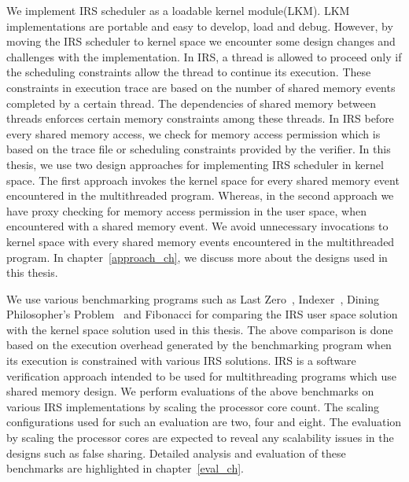 We implement IRS scheduler as a loadable kernel module(LKM). 
LKM implementations are portable and easy to develop, load and debug. 
However, by moving the IRS scheduler to kernel space we encounter some design changes and challenges with the implementation. 
In IRS, a thread is allowed to proceed only if the scheduling constraints allow the thread to continue its execution. 
These constraints in execution trace are based on the number of shared memory events completed by a certain thread. 
The dependencies of shared memory between threads enforces certain memory constraints among these threads. 
In IRS before every shared memory access, we check for memory access permission which is based on the trace file or scheduling constraints provided by the verifier. 
In this thesis, we use two design approaches for implementing IRS scheduler in kernel space. 
The first approach invokes the kernel space for every shared memory event encountered in the multithreaded program. 
Whereas, in the second approach we have proxy checking for memory access permission in the user space, when encountered with a shared memory event. 
We avoid unnecessary invocations to kernel space with every shared memory events encountered in the multithreaded program. 
In chapter~\ref{approach_ch}, we discuss more about the designs used in this thesis. 

We use various benchmarking programs such as Last Zero~\citep{abdulla2014optimal}, Indexer~\citep{dynamic_por}, Dining Philosopher's Problem~\citep{silberschatz2014operating} and Fibonacci for comparing the IRS user space solution with the kernel space solution used in this thesis. 
The above comparison is done based on the execution overhead generated by the benchmarking program when its execution is constrained with various IRS solutions. 
IRS is a software verification approach intended to be used for multithreading programs which use shared memory design. 
We perform evaluations of the above benchmarks on various IRS implementations by scaling the processor core count. 
The scaling configurations used for such an evaluation are two, four and eight. 
The evaluation by scaling the processor cores are expected to reveal any scalability issues in the designs such as false sharing. 
Detailed analysis and evaluation of these benchmarks are highlighted in chapter~\ref{eval_ch}.